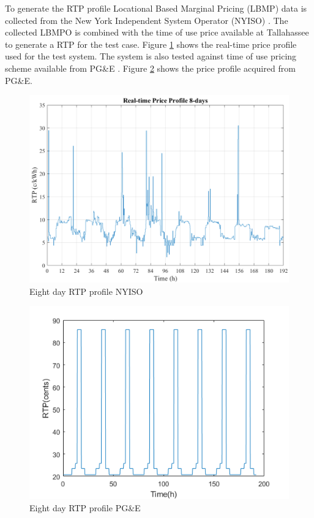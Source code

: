 To generate the RTP profile Locational Based Marginal Pricing (LBMP) data is collected from the New York Independent System Operator (NYISO) \cite{NYISO2017}. The collected LBMPO is combined with the time of use price available at Tallahassee to generate a RTP for the test case. Figure \ref{fig:RTP_PROFILE_8} shows the real-time price profile used for the test system. The system is also tested against time of use pricing scheme available from PG\&E \cite{pgne}. Figure \ref{fig:PGNE_PRICE} shows the price profile acquired from PG\&E.

\begin{figure}[!ht]
    \centering
    \includegraphics[width = \linewidth]{figs/rtp_8days.png}
    \caption{Eight day RTP profile NYISO}
    \label{fig:RTP_PROFILE_8}
\end{figure}

\begin{figure}[!ht]
    \centering
    \includegraphics[width = \linewidth]{figs/PGNE_PRICE.png}
    \caption{Eight day RTP profile PG\&E}
    \label{fig:PGNE_PRICE}
\end{figure}

